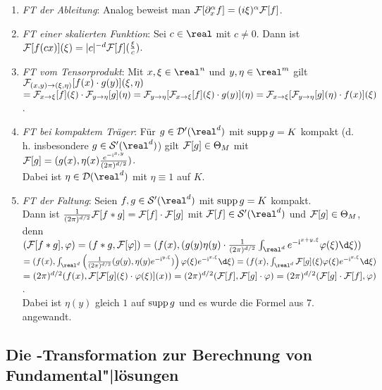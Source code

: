\begin{enumerate}
    \item
    \emph{FT der Ableitung}:
    Analog beweist man $\mathcal{F}[\partial_x^\alpha f] = (i\xi)^\alpha \mathcal{F}[f]$.

    \item
    \emph{FT einer skalierten Funktion}:
    Sei $c \in \real$ mit $c \not= 0$.
    Dann ist $\mathcal{F}[f(cx)](\xi) = |c|^{-d} \mathcal{F}[f](\frac{\xi}{c})$.

    \item
    \emph{FT vom Tensorprodukt}:
    Mit $x, \xi \in \real^n$ und $y, \eta \in \real^m$ gilt
    $\mathcal{F}_{(x, y) \to (\xi, \eta)}[f(x) \cdot g(y)](\xi, \eta)$\\
    $= \mathcal{F}_{x \to \xi}[f](\xi) \cdot \mathcal{F}_{y \to \eta}[g](\eta) =
    \mathcal{F}_{y \to \eta}[\mathcal{F}_{x \to \xi}[f](\xi) \cdot g(y)](\eta) =
    \mathcal{F}_{x \to \xi}[\mathcal{F}_{y \to \eta}[g](\eta) \cdot f(x)](\xi)$.

    \item
    \emph{FT bei kompaktem Träger}:
    Für $g \in \D'(\real^d)$ mit $\operatorname{supp} g = K$ kompakt
    (d.\,h. insbesondere $g \in \S'(\real^d)$) gilt
    $\mathcal{F}[g] \in \Theta_M$ mit
    $\mathcal{F}[g] = (g(x), \eta(x)\frac{e^{-\mathrm{i}\sp{x, y}}}{(2\pi)^{d/2}})$.\\
    Dabei ist $\eta \in \D(\real^d)$ mit $\eta \equiv 1$ auf $K$.

    \item
    \emph{FT der Faltung}:
    Seien $f, g \in \S'(\real^d)$ mit $\operatorname{supp} g = K$ kompakt.\\
    Dann ist $\frac{1}{(2\pi)^{d/2}} \mathcal{F}[f \ast g] = \mathcal{F}[f] \cdot \mathcal{F}[g]$
    mit $\F[f] \in \S'(\real^d)$ und $\mathcal{F}[g] \in \Theta_M$, denn\\
    $(\F[f \ast g], \varphi) = (f \ast g, \F[\varphi]) =
    (f(x), (g(y)\eta(y) \cdot \frac{1}{(2\pi)^{d/2}}
    \int_{\real^d} e^{-\i\sp{x + y, \xi}}\varphi(\xi)\d\xi))$\\
    $= (f(x), \int_{\real^d}
    \left(\frac{1}{(2\pi)^{d/2}} (g(y), \eta(y)e^{-\i\sp{y, \xi}})\right)
    \varphi(\xi)e^{-\i\sp{x, \xi}}\d\xi) =
    (f(x), \int_{\real^d} \F[g](\xi)\varphi(\xi)e^{-\i\sp{x, \xi}}\d\xi)$\\
    $= (2\pi)^{d/2} (f(x), \mathcal{F}[\mathcal{F}[g](\xi) \cdot \varphi(\xi)](x)) =
    (2\pi)^{d/2} (\mathcal{F}[f], \mathcal{F}[g] \cdot \varphi) =
    (2\pi)^{d/2} (\mathcal{F}[g] \cdot \mathcal{F}[f], \varphi)$.\\
    Dabei ist $\eta(y)$ gleich $1$ auf $\operatorname{supp} g$ und es wurde die Formel aus
    7. angewandt.
\end{enumerate}

\subsection{%
    Die -Transformation zur Berechnung von Fundamental"|lösungen%
}

